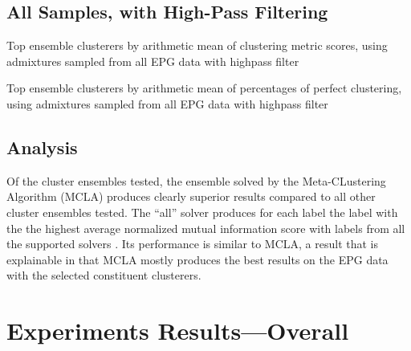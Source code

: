 \FloatBarrier
\subsection{All Samples, with High-Pass Filtering}

\begin{table}[htbp]
\centering
{}
\caption{Top ensemble clusterers by arithmetic mean of clustering metric scores, using admixtures sampled from all EPG data with highpass filter}
\label{table:top_ensemble_clusterers_by_metrics_highpass_71-sampleids_all-nruns_1000}
\end{table}

\begin{table}[htbp]
\centering
{}
\caption{Top ensemble clusterers by arithmetic mean of percentages of perfect clustering, using admixtures sampled from all EPG data with highpass filter}
\label{table:top_ensemble_clusterers_by_binomial_confidence_highpass_71-sampleids_all-nruns_1000}
\end{table}

\FloatBarrier
\subsection{Analysis}

Of the cluster ensembles tested, the ensemble solved by the Meta-CLustering Algorithm (MCLA) produces clearly superior results compared to all other cluster ensembles tested. The ``all'' solver produces for each label the label with the the highest average normalized mutual information score with labels from all the supported solvers \cite{sano_clusterensembles_nodate}. Its performance is similar to MCLA, a result that is explainable in that MCLA mostly produces the best results on the EPG data with the selected constituent clusterers.

\section{Experiments Results---Overall}

